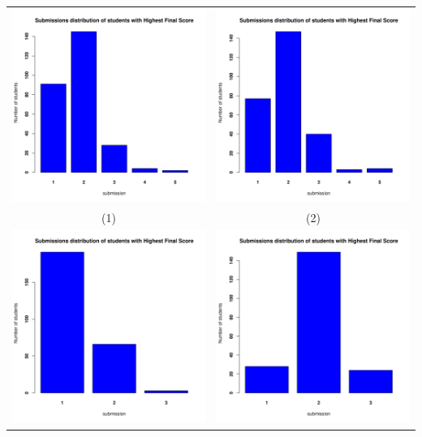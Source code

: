 \documentclass[a4paper]{article}
\theoremstyle{definition}
\begin{document}
\begin{enumerate}[a)]
\begin{itemize}
\begin{center}
\begin{tabular}{c c}
                 \includegraphics[width = 6.9cm]{Images/img2-4-1.png} & \includegraphics[width = 6.9cm]{Images/img2-4-2.png} \\
                 (1) & (2) \\
                 \includegraphics[width = 6.9cm]{Images/img2-4-3.png} &
                 \includegraphics[width = 6.9cm]{Images/img2-4-4.png} \\

\end{tabular}
\end{center}
\end{itemize}
\end{enumerate}
\end{document}
